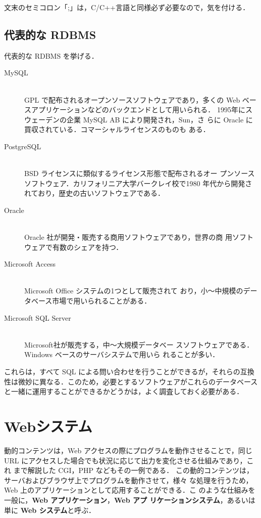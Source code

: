 文末のセミコロン「;」は，C/C++言語と同様必ず必要なので，気を付ける．

\subsection{代表的な RDBMS}

代表的な RDBMS を挙げる．

\begin{description}
 \item[MySQL] \mbox{} \\
            GPL で配布されるオープンソースソフトウェアであり，多くの
	    Web ベースアプリケーションなどのバックエンドとして用いられる．
	    1995年にスウェーデンの企業 MySQL AB により開発され，Sun，さ
	    らに Oracle に買収されている．コマーシャルライセンスのものも
	    ある．
 \item[PostgreSQL] \mbox{} \\
            BSD ライセンスに類似するライセンス形態で配布されるオー
	    プンソースソフトウェア．カリフォリニア大学バークレイ校で1980
	    年代から開発されており，歴史の古いソフトウェアである．
 \item[Oracle] \mbox{} \\
            Oracle 社が開発・販売する商用ソフトウェアであり，世界の商
	    用ソフトウェアで有数のシェアを持つ．
 \item[Microsoft Access] \mbox{} \\
            Microsoft Office システムの1つとして販売されて
	    おり，小〜中規模のデータベース市場で用いられることがある．
 \item[Microsoft SQL Server] \mbox{} \\
            Microsoft社が販売する，中〜大規模データベー
	    スソフトウェアである．Windows ベースのサーバシステムで用いら
	    れることが多い．
\end{description}

これらは，すべて SQL による問い合わせを行うことができるが，それらの互換
性は微妙に異なる．このため，必要とするソフトウェアがこれらのデータベース
と一緒に運用することができるかどうかは，よく調査しておく必要がある．


\section{Webシステム}
動的コンテンツは，Web アクセスの際にプログラムを動作させることで，同じ
URL にアクセスした場合でも状況に応じて出力を変化させる仕組みであり，これ
まで解説した CGI，PHP などもその一例である．
この動的コンテンツは，サーバおよびブラウザ上でプログラムを動作させて，様々
な処理を行うため，Web 上のアプリケーションとして応用することができる．こ
のような仕組みを一般に，\textbf{Web アプリケーション}，\textbf{Web アプ
リケーションシステム}，あるいは単に \textbf{Web システム}と呼ぶ．

